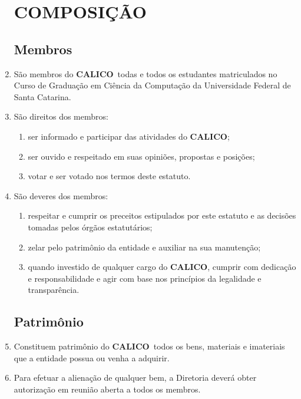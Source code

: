 \documentclass[12pt,a4paper]{article}
\newcommand{\calico}{\textbf{CALICO}}
\begin{document}
\begin{enumerate}[label=\textbf{Art. \arabic*º.}]
\section{COMPOSIÇÃO}
    
\subsection{Membros}
    
    \item São membros do \calico\ todas e todos os estudantes matriculados no Curso de Graduação em Ciência da Computação da Universidade Federal de Santa Catarina.
    
    \item São direitos dos membros:
    \begin{enumerate}[label=\textbf{\Roman* - }]
        \item ser informado e participar das atividades do \calico;
        \item ser ouvido e respeitado em suas opiniões, propostas e posições;
        \item votar e ser votado nos termos deste estatuto.
    \end{enumerate}
    
    \item São deveres dos membros:
    \begin{enumerate}[label=\textbf{\Roman* - }]
        \item respeitar e cumprir os preceitos estipulados por este estatuto e as decisões tomadas pelos órgãos estatutários;
        \item zelar pelo patrimônio da entidade e auxiliar na sua manutenção;
        \item quando investido de qualquer cargo do \calico, cumprir com dedicação e responsabilidade e agir com base nos princípios da legalidade e transparência.
    \end{enumerate}

\subsection{Patrimônio}
    
    \item Constituem patrimônio do \calico\ todos os bens, materiais e imateriais que a entidade possua ou venha a adquirir.
    
    \item Para efetuar a alienação de qualquer bem, a Diretoria deverá obter autorização em reunião aberta a todos os membros.
    

\end{enumerate}
\end{document}
